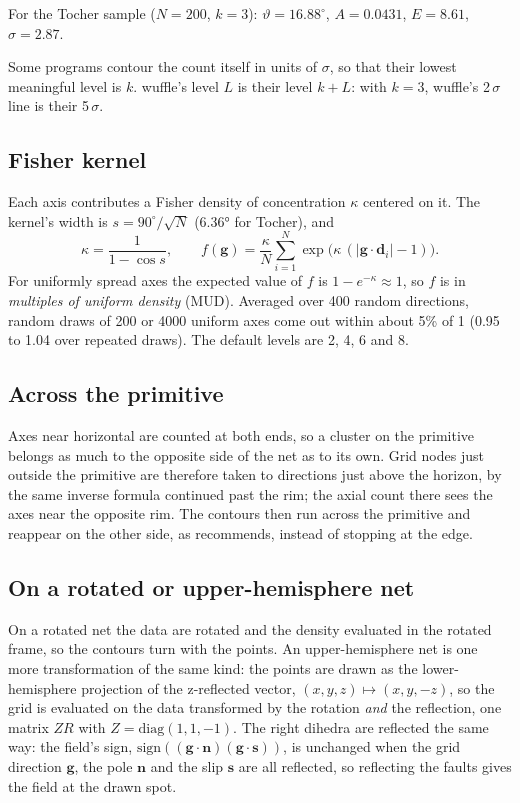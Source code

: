 For the Tocher sample ($N = 200$, $k = 3$): $\vartheta = 16.88^\circ$, $A = 0.0431$, $E = 8.61$,
$\sigma = 2.87$.

\begin{note}
Some programs contour the count itself in units of $\sigma$, so that their lowest meaningful level is $k$.
wuffle's level $L$ is their level $k + L$: with $k = 3$, wuffle's 2\,$\sigma$ line is their 5\,$\sigma$.
\end{note}

\subsection{Fisher kernel}

Each axis contributes a Fisher density of concentration $\kappa$ centered on it. The kernel's width is
$s = 90^\circ/\sqrt{N}$ (6.36° for Tocher), and
\[ \kappa = \frac{1}{1 - \cos s}, \qquad f(\mathbf{g}) = \frac{\kappa}{N}\sum_{i=1}^{N} \exp\!\bigl(\kappa\,(|\mathbf{g}\cdot\mathbf{d}_i| - 1)\bigr). \]
For uniformly spread axes the expected value of $f$ is $1 - e^{-\kappa} \approx 1$, so $f$ is in
\emph{multiples of uniform density} (MUD). Averaged over 400 random directions, random draws of 200 or 4000
uniform axes come out within about 5\% of 1 (0.95 to 1.04 over repeated draws). The default levels are 2,
4, 6 and 8.

\subsection{Across the primitive}

Axes near horizontal are counted at both ends, so a cluster on the primitive belongs as much to the
opposite side of the net as to its own. Grid nodes just outside the primitive are therefore taken to
directions just above the horizon, by the same inverse formula continued past the rim; the axial count
there sees the axes near the opposite rim. The contours then run across the primitive and reappear on
the other side, as \textcite{tocher1979} recommends, instead of stopping at the edge.

\subsection{On a rotated or upper-hemisphere net}

On a rotated net the data are rotated and the density evaluated in the rotated frame, so the contours
turn with the points. An upper-hemisphere net is one more transformation of the same kind: the points
are drawn as the lower-hemisphere projection of the z-reflected vector, $(x, y, z) \mapsto (x, y, -z)$,
so the grid is evaluated on the data transformed by the rotation \emph{and} the reflection, one matrix
$Z R$ with $Z = \mathrm{diag}(1, 1, -1)$. The right dihedra are reflected the same way: the field's sign,
$\mathrm{sign}((\mathbf{g}\cdot\mathbf{n})(\mathbf{g}\cdot\mathbf{s}))$, is unchanged when the grid
direction $\mathbf{g}$, the pole $\mathbf{n}$ and the slip $\mathbf{s}$ are all reflected, so reflecting
the faults gives the field at the drawn spot.

